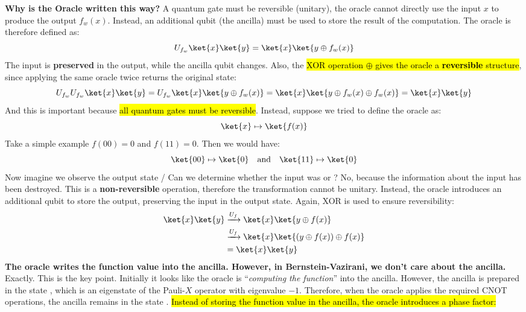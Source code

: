 \highspace
\textcolor{Green3}{ \textbf{Why is the Oracle written this way?}} A quantum gate must be reversible (unitary), the oracle cannot directly use the input $x$ to produce the output $f_w(x)$. Instead, an additional qubit (the ancilla) must be used to store the result of the computation. The oracle is therefore defined as:
\begin{equation*}
    U_{f_w} \ket{x}\ket{y} = \ket{x}\ket{y \oplus f_w(x)}
\end{equation*}
The input  is \textbf{preserved} in the output, while the ancilla qubit  changes. Also, the \hl{XOR operation $\oplus$ gives the oracle a \textbf{reversible} structure}, since applying the same oracle twice returns the original state:
\begin{equation*}
    U_{f_w} U_{f_w} \ket{x}\ket{y} = U_{f_w} \ket{x}\ket{y \oplus f_w(x)} = \ket{x}\ket{y \oplus f_w(x) \oplus f_w(x)} = \ket{x}\ket{y}
\end{equation*}
And this is important because \hl{all quantum gates must be reversible}. Instead, suppose we tried to define the oracle as:
\begin{equation*}
    \ket{x} \mapsto \ket{f(x)}
\end{equation*}
Take a simple example $f(00) = 0$ and $f(11) = 0$. Then we would have:
\begin{equation*}
    \ket{00} \mapsto \ket{0} \quad \text{and} \quad \ket{11} \mapsto \ket{0}
\end{equation*}
Now imagine we observe the output state / Can we determine whether the input was  or ? No, because the information about the input has been destroyed. This is a \textbf{non-reversible} operation, therefore the transformation cannot be unitary. Instead, the oracle introduces an additional qubit to store the output, preserving the input  in the output state. Again, XOR is used to ensure reversibility:
\begin{equation*}
    \begin{aligned}
        \ket{x}\ket{y}  & \xrightarrow{U_f} \ket{x}\ket{y \oplus f(x)} \\
        & \xrightarrow{U_f} \ket{x}\ket{\left(y \oplus f(x)\right) \oplus f(x)} \\
        & = \ket{x}\ket{y}
    \end{aligned}
\end{equation*}
\textcolor{Green3}{ \textbf{The oracle writes the function value into the ancilla. However, in Bernstein-Vazirani, we don't care about the ancilla.}} Exactly. This is the key point. Initially it looks like the oracle is ``\emph{computing the function}'' into the ancilla. However, the ancilla is prepared in the state \ket{-}, which is an eigenstate of the Pauli-$X$ operator with eigenvalue $-1$. Therefore, when the oracle applies the required CNOT operations, the ancilla remains in the state \ket{-}. \hl{Instead of storing the function value in the ancilla, the oracle introduces a phase factor:}
